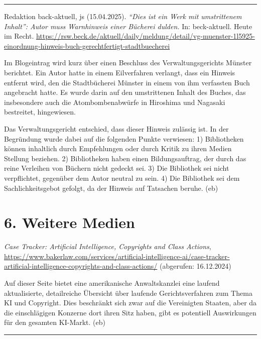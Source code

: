 \documentclass[a4paper,
fontsize=11pt,
oneside,
numbers=noperiodatend,
parskip=half-,
bibliography=totoc,
final
]{scrartcl}
\begin{document}
\begin{center}\rule{0.5\linewidth}{0.5pt}\end{center}

Redaktion back-aktuell, js (15.04.2025). \emph{\enquote{Dies ist ein Werk mit
umstrittenem Inhalt}: Autor muss Warnhinweis einer Bücherei dulden.} In:
beck-aktuell. Heute im Recht.
\url{https://rsw.beck.de/aktuell/daily/meldung/detail/vg-muenster-1l5925-einordnung-hinweis-buch-gerechtfertigt-stadtbuecherei}

Im Blogeintrag wird kurz über einen Beschluss des Verwaltungsgerichts
Münster berichtet. Ein Autor hatte in einem Eilverfahren verlangt, dass
ein Hinweis entfernt wird, den die Stadtbücherei Münster in einem von
ihm verfassten Buch angebracht hatte. Es wurde darin auf den
umstrittenen Inhalt des Buches, das insbesondere auch die
Atombombenabwürfe in Hiroshima und Nagasaki bestreitet, hingewiesen.

Das Verwaltungsgericht entschied, dass dieser Hinweis zulässig ist. In
der Begründung wurde dabei auf die folgenden Punkte verwiesen: 1)
Bibliotheken können inhaltlich durch Empfehlungen oder durch Kritik zu
ihren Medien Stellung beziehen. 2) Bibliotheken haben einen
Bildungsauftrag, der durch das reine Verleihen von Büchern nicht gedeckt
sei. 3) Die Bibliothek sei nicht verpflichtet, gegenüber dem Autor
neutral zu sein. 4) Die Bibliothek sei dem Sachlichkeitsgebot gefolgt,
da der Hinweis auf Tatsachen beruhe. (eb)

\section{6. Weitere Medien}\label{weitere-medien}

\emph{Case Tracker: Artificial Intelligence, Copyrights and Class
Actions},
\url{https://www.bakerlaw.com/services/artificial-intelligence-ai/case-tracker-artificial-intelligence-copyrights-and-class-actions/}
(abgerufen: 16.12.2024)

Auf dieser Seite bietet eine amerikanische Anwaltskanzlei eine laufend
aktualisierte, detailreiche Übersicht über laufende Gerichtsverfahren
zum Thema KI und Copyright. Dies beschränkt sich zwar auf die
Vereinigten Staaten, aber da die einschlägigen Konzerne dort ihren Sitz
haben, gibt es potentiell Auswirkungen für den gesamten KI-Markt. (eb)

\begin{center}\rule{0.5\linewidth}{0.5pt}\end{center}
\end{document}
